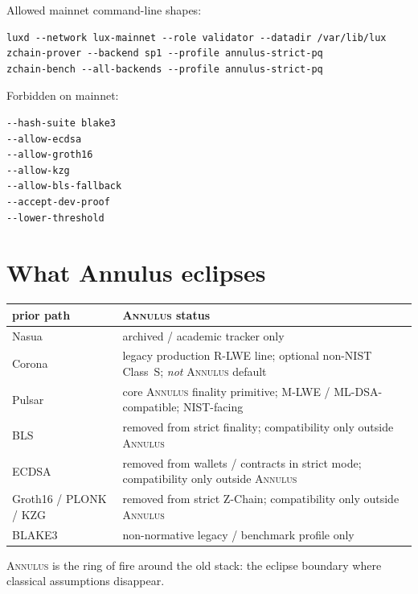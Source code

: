 \documentclass[11pt,a4paper]{article}
\newcommand{\Annulus}{\textsc{Annulus}}
\begin{document}
Allowed mainnet command-line shapes:

\begin{verbatim}
luxd --network lux-mainnet --role validator --datadir /var/lib/lux
zchain-prover --backend sp1 --profile annulus-strict-pq
zchain-bench --all-backends --profile annulus-strict-pq
\end{verbatim}

Forbidden on mainnet:

\begin{verbatim}
--hash-suite blake3
--allow-ecdsa
--allow-groth16
--allow-kzg
--allow-bls-fallback
--accept-dev-proof
--lower-threshold
\end{verbatim}

\section{What Annulus eclipses}
\label{sec:eclipses}

\begin{center}\small
\begin{tabular}{l l}
\toprule
prior path & \Annulus{} status \\
\midrule
Nasua             & archived / academic tracker only \\
Corona            & legacy production R-LWE line; optional non-NIST Class~S; \emph{not} \Annulus{} default \\
Pulsar            & core \Annulus{} finality primitive; M-LWE / ML-DSA-compatible; NIST-facing \\
BLS               & removed from strict finality; compatibility only outside \Annulus{} \\
ECDSA             & removed from wallets / contracts in strict mode; compatibility only outside \Annulus{} \\
Groth16 / PLONK / KZG & removed from strict Z-Chain; compatibility only outside \Annulus{} \\
BLAKE3            & non-normative legacy / benchmark profile only \\
\bottomrule
\end{tabular}
\end{center}

\Annulus{} is the ring of fire around the old stack: the eclipse
boundary where classical assumptions disappear.

\end{document}
